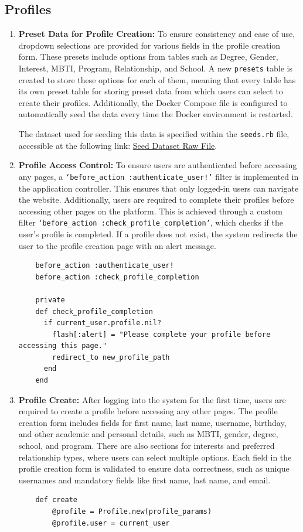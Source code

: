 \subsection{Profiles}
\begin{enumerate}
    \item \textbf{Preset Data for Profile Creation:} 
    To ensure consistency and ease of use, dropdown selections are provided for various fields in the profile creation form. These presets include options from tables such as Degree, Gender, Interest, MBTI, Program, Relationship, and School. A new \texttt{presets} table is created to store these options for each of them, meaning that every table has its own preset table for storing preset data from which users can select to create their profiles. Additionally, the Docker Compose file is configured to automatically seed the data every time the Docker environment is restarted. 

    \bigskip
    The dataset used for seeding this data is specified within the \texttt{seeds.rb} file, accessible at the following link:
    \href{https://raw.githubusercontent.com/werrnnnwerrrnnnnnn/AIT-Match/29f98b79013186116728a6cc8f13855453c216bd/app/db/seeds.rb}{Seed Dataset Raw File}.

    \item \textbf{Profile Access Control:} 
    To ensure users are authenticated before accessing any pages, a \texttt{`before\_action :authenticate\_user!'} filter is implemented in the application controller. This ensures that only logged-in users can navigate the website. Additionally, users are required to complete their profiles before accessing other pages on the platform. This is achieved through a custom filter \texttt{`before\_action :check\_profile\_completion'}, which checks if the user’s profile is completed. If a profile does not exist, the system redirects the user to the profile creation page with an alert message.
    \begin{lstlisting}
    before_action :authenticate_user!
    before_action :check_profile_completion
    
    private
    def check_profile_completion
      if current_user.profile.nil?
        flash[:alert] = "Please complete your profile before accessing this page."
        redirect_to new_profile_path
      end
    end
    \end{lstlisting}

    \newpage
    \item \textbf{Profile Create:} 
    After logging into the system for the first time, users are required to create a profile before accessing any other pages. The profile creation form includes fields for first name, last name, username, birthday, and other academic and personal details, such as MBTI, gender, degree, school, and program. There are also sections for interests and preferred relationship types, where users can select multiple options. Each field in the profile creation form is validated to ensure data correctness, such as unique usernames and mandatory fields like first name, last name, and email.
    \begin{lstlisting}
    def create
        @profile = Profile.new(profile_params)
        @profile.user = current_user
      

\end{lstlisting}
\end{enumerate}

